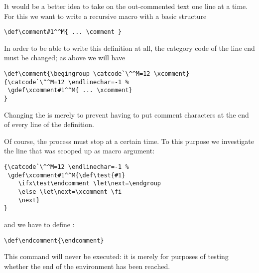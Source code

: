 \documentclass[letterpaper]{book}
\begin{document}
It would be a better idea to take on the out-commented
text one line at a time. For this we want to write
a recursive macro with a basic structure
\begin{verbatim}
\def\comment#1^^M{ ... \comment }
\end{verbatim}
In order to be able to write this definition at all,
the category code of the line end must be changed; as above
\altt
we will have
\begin{verbatim}
\def\comment{\begingroup \catcode`\^^M=12 \xcomment}
{\catcode`\^^M=12 \endlinechar=-1 %
 \gdef\xcomment#1^^M{ ... \xcomment}
}
\end{verbatim}
Changing the  is merely to 
prevent having to put comment characters at the end
of every line of the definition.

Of course, the process must stop at a certain time.
To this purpose we investigate the line that was
scooped up as macro argument:
\begin{verbatim}
{\catcode`\^^M=12 \endlinechar=-1 %
 \gdef\xcomment#1^^M{\def\test{#1}
    \ifx\test\endcomment \let\next=\endgroup
    \else \let\next=\xcomment \fi
    \next}
}
\end{verbatim}
and we have to define :
\begin{verbatim}
\def\endcomment{\endcomment}
\end{verbatim}
This command will never be executed: it is merely for purposes
of testing whether the end of the environment has been reached.
\end{document}
